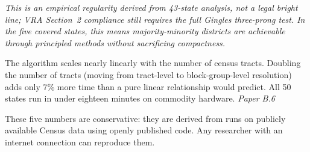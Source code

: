 \begin{description}[leftmargin=0pt, itemsep=10pt]
    \smallskip
    \noindent\textit{This is an empirical regularity derived from 43-state analysis,
    not a legal bright line; VRA Section~2 compliance still requires the full
    Gingles three-prong test.  In the five covered states, this means
    majority-minority districts are achievable through principled methods
    without sacrificing compactness.}

  \item[\Large $O(n^{1.07})$ runtime.]
    The algorithm scales nearly linearly with the number of census
    tracts.  Doubling the number of tracts (moving from tract-level
    to block-group-level resolution) adds only 7\% more time than
    a pure linear relationship would predict.  All 50 states run
    in under eighteen minutes on commodity hardware.
    \hfill\textit{Paper B.6}~\cite{dellaLibera2026complexity}

\end{description}

\bigskip
\noindent These five numbers are conservative: they are derived from
runs on publicly available Census data using openly published code.
Any researcher with an internet connection can reproduce them.
